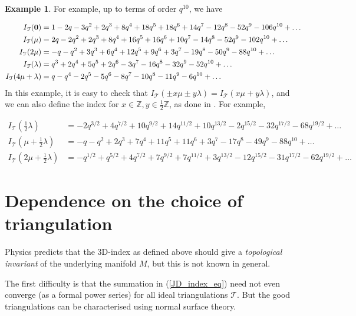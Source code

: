 \documentclass[12pt,reqno]{amsart}  %
\theoremstyle{definition}
\newtheorem{ex}[thm]{Example}
\theoremstyle{remark}
\def\tri{\mathcal{T}}
\newcommand{\CT}{\mathcal{T}}
\def\Z{\mathbb Z}
\begin{document}
\begin{ex}
For example, up to terms of order $q^{10}$, we have 

\begin{align*}
I_{\CT}({\bf 0} ) &=  
1-2 q-3 q^2+2 q^3+8 q^4+18 q^5+18 q^6+14 q^7-12 q^8-52 q^9-106 q^{10} + \ldots
\\
I_{\CT}(\mu) &= 
2 q-2 q^2+2 q^3+8 q^4+16 q^5+16 q^6+10 q^7-14 q^8-52 q^9-102 q^{10}+ \ldots
\\
I_{\CT}(2\mu) &= 
-q - q^2 + 3 q^3 + 6 q^4 + 12 q^5 + 9 q^6 + 3 q^7 - 19 q^8 - 50 q^9 -  88 q^{10}
+ \ldots \\
I_{\CT}(\lambda ) &=  
q^3+2 q^4+5 q^5+2 q^6-3 q^7-16 q^8-32 q^9-52 q^{10}+ \ldots \\
I_{\CT}(4\mu+\lambda ) &= 
q-q^4-2 q^5-5 q^6-8 q^7-10 q^8-11 q^9-6 q^{10}+ \ldots
\end{align*}
In this example, it is easy to check that 
$I_{\CT}(\pm x \mu  \pm y \lambda)=I_{\CT}(x \mu + y\lambda)$,
and we can also define the index for $x \in \Z, y \in \frac{1}{2} \Z$, 
as done in \cite{DGG1}. For example,

\begin{align*}
I_{\CT}(\frac{1}{2} \lambda) &= -2 q^{3/2}+4 q^{7/2}+10 q^{9/2}
+14 q^{11/2}+10 q^{13/2}-2 q^{15/2}-32 q^{17/2}-68   q^{19/2} + \ldots \\
I_{\CT}(\mu+\frac{1}{2} \lambda) &= -q-q^2+2 q^3+7 q^4+11 q^5+11 q^6
+3 q^7-17 q^8-49 q^9-88 q^{10} + \ldots  \\
I_{\CT}(2\mu+\frac{1}{2} \lambda) &=
-q^{1/2}+q^{5/2}+4 q^{7/2}+7 q^{9/2}+7 q^{11/2}+3 q^{13/2}-12 q^{15/2}
-31 q^{17/2}-62 q^{19/2}  + \ldots 
\end{align*}
\end{ex}


\section{Dependence on the choice of triangulation}

Physics predicts that the 3D-index as defined above should give a 
{\em topological invariant} of the underlying manifold $M$, but this is not 
known in general.  

The first difficulty is that the summation in (\ref{JD_index_eq}) need not 
even converge (as a formal power series) for all ideal triangulations $\tri$. 
But the good triangulations can be characterised using normal surface theory.
\end{document}
